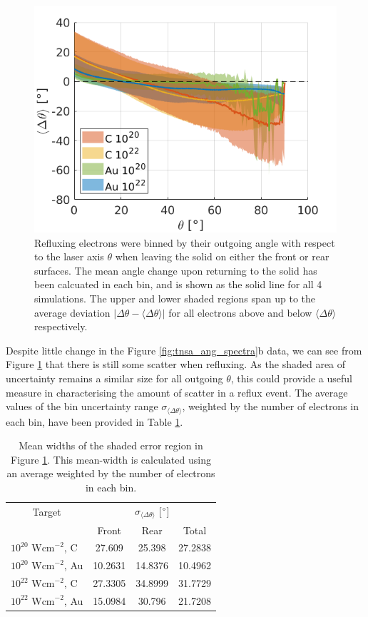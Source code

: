 \documentclass[12pt]{article}
\numberwithin{equation}{section}
\begin{document}
\begin{figure}
\centering
  \includegraphics[width=0.6\linewidth]{Figures/theta_change.png}
\caption{Refluxing electrons were binned by their outgoing angle with respect to the laser axis $\theta$ when leaving the solid on either the front or rear surfaces. The mean angle change upon returning to the solid has been calcuated in each bin, and is shown as the solid line for all 4 simulations. The upper and lower shaded regions span up to the average deviation $|\Delta\theta - \langle\Delta\theta\rangle|$ for all electrons above and below $\langle\Delta\theta\rangle$ respectively. }
\label{fig:tnsa_theta_change}
\end{figure}

Despite little change in the Figure \ref{fig:tnsa_ang_spectra}b data, we can see from Figure \ref{fig:tnsa_theta_change} that there is still some scatter when refluxing. As the shaded area of uncertainty remains a similar size for all outgoing $\theta$, this could provide a useful measure in characterising the amount of scatter in a reflux event. The average values of the bin uncertainty range $\sigma_{\langle\Delta\theta\rangle}$, weighted by the number of electrons in each bin, have been provided in Table \ref{table:tnsa_dang}.

\begin{table}[h!]
\centering
\begin{tabular}{l c c c}
\toprule
\multicolumn{1}{c}{Target} & \multicolumn{3}{c}{$\sigma_{\langle\Delta\theta\rangle}$ [$\degree$]} \\
 & Front & Rear & Total \\
\midrule
$10^{20} \text{ Wcm}^{-2}$, C & 27.609 & 25.398 & 27.2838 \\
$10^{20} \text{ Wcm}^{-2}$, Au & 10.2631 & 14.8376 & 10.4962 \\
$10^{22} \text{ Wcm}^{-2}$, C & 27.3305 & 34.8999 & 31.7729 \\
$10^{22} \text{ Wcm}^{-2}$, Au & 15.0984 & 30.796 & 21.7208 \\
\bottomrule
\end{tabular}
\caption{Mean widths of the shaded error region in Figure \ref{fig:tnsa_theta_change}. This mean-width is calculated using an average weighted by the number of electrons in each bin.}
\label{table:tnsa_dang} 
\end{table}
\end{document}
